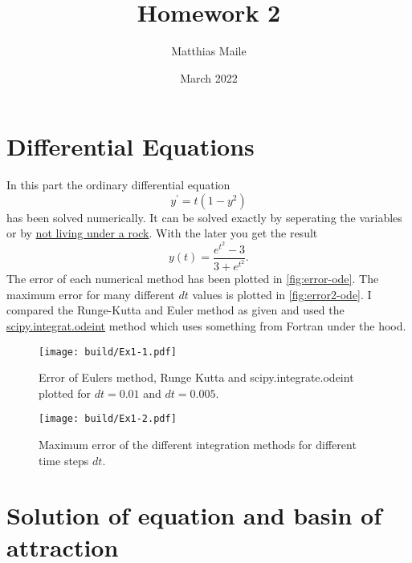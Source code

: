 \documentclass[twocolumn]{article}
\author{Matthias Maile}
\date{March 2022}
\title{Homework 2}
\begin{document}
\maketitle
\tableofcontents

\section{Differential Equations}
In this part the ordinary differential equation
\[
  y^\prime = t ( 1-y^2)
\]
has been solved numerically. It can be solved exactly by seperating the variables or by 
\href{https://www.wolframalpha.com/input?i=y%27+%3D+t+*+%281-y%5E2%29%2C+y%280%29+%3D+-0.5}{not living under a rock}. With the
later you get the result 
\[
  y(t) = \frac{e^{t^2} - 3}{3 + e^{t^2}}.
\]
The error of each numerical method has been plotted in \autoref{fig:error-ode}. The maximum error for many different
$dt$ values is plotted in \autoref{fig:error2-ode}. I compared the Runge-Kutta and Euler method as given and used the
\href{https://docs.scipy.org/doc/scipy/reference/generated/scipy.integrate.odeint.html}{scipy.integrat.odeint}
method which uses something from Fortran under the hood.
\begin{figure}
	\centering
  \texttt{[image: build/Ex1-1.pdf]}
	\caption{Error of Eulers method, Runge Kutta and scipy.integrate.odeint plotted for $dt = 0.01$ and $dt = 0.005$.}
  \label{fig:error-ode}
\end{figure}
\begin{figure}
	\centering
  \texttt{[image: build/Ex1-2.pdf]}
	\caption{Maximum error of the different integration methods for different time steps $dt$.}
  \label{fig:error2-ode}
\end{figure}

\section{Solution of equation and basin of attraction}
\end{document}
